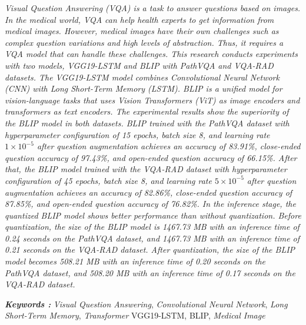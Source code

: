 \begin{abstracteng}

\textit{Visual Question Answering (VQA) is a task to answer questions based on images. In the medical world, VQA can help health experts to get information from medical images. However, medical images have their own challenges such as complex question variations and high levels of abstraction. Thus, it requires a VQA model that can handle these challenges. This research conducts experiments with two models, VGG19-LSTM and BLIP with PathVQA and VQA-RAD datasets. The VGG19-LSTM model combines Convolutional Neural Network (CNN) with Long Short-Term Memory (LSTM). BLIP is a unified model for vision-language tasks that uses Vision Transformers (ViT) as image encoders and transformers as text encoders. The experimental results show the superiority of the BLIP model in both datasets. BLIP trained with the PathVQA dataset with hyperparameter configuration of 15 epochs, batch size 8, and learning rate $1 \times 10^{-5}$ after question augmentation achieves an accuracy of 83.91\%, close-ended question accuracy of 97.43\%, and open-ended question accuracy of 66.15\%. After that, the BLIP model trained with the VQA-RAD dataset with hyperparameter configuration of 45 epochs, batch size 8, and learning rate $5 \times 10^{-5}$ after question augmentation achieves an accuracy of 82.86\%, close-ended question accuracy of 87.85\%, and open-ended question accuracy of 76.82\%. In the inference stage, the quantized BLIP model shows better performance than without quantization. Before quantization, the size of the BLIP model is 1467.73 MB with an inference time of 0.24 seconds on the PathVQA dataset, and 1467.73 MB with an inference time of 0.21 seconds on the VQA-RAD dataset. After quantization, the size of the BLIP model becomes 508.21 MB with an inference time of 0.20 seconds on the PathVQA dataset, and 508.20 MB with an inference time of 0.17 seconds on the VQA-RAD dataset.}

\bigskip
\noindent
\textit{\textbf{Keywords :}} \textit{Visual Question Answering}, \textit{Convolutional Neural Network}, \textit{Long Short-Term Memory}, \textit{Transformer} VGG19-LSTM, BLIP, \textit{Medical Image}
\end{abstracteng}